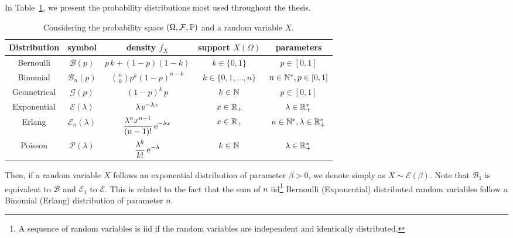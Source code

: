 In Table~\ref{tab:distributions}, we present the probability distributions most used throughout the thesis.
%
\def\arraystretch{1.8}
\begin{table}[H]
    \centering
    \begin{tabular}{c|c|c|c|c}
    \hline
        Distribution  & symbol & density $f_X$ & support $X(\Omega)$ & parameters\\ \hline\hline
        Bernoulli & $\mathscr{B}(p)$ & {\footnotesize$p\,k+(1-p)(1-k)$}  & $k\in\{0,1\}$ & $p\in[0,1]$\\
        Binomial & $\mathscr{B}_n(p)$ & \footnotesize$\displaystyle\binom{n}{k} p^k(1-p)^{n-k}$ & $k\in\{0,1,\dots,n\}$ & $n\in\N^*, p\in[0,1]$\\
        Geometrical & $\mathscr{G}(p)$ & \footnotesize$(1-p)^k\,p$ & $k\in\N$ & $p\in[0,1]$\\
        Exponential & $\mathscr{E}(\lambda)$ & \footnotesize$\lambda \,\euler^{-\lambda x}$ & $x\in\R_+$ & $\lambda\in\R_+^*$\\
        Erlang & $\mathscr{E}_n(\lambda)$ & \footnotesize$\displaystyle\frac{\lambda^n x^{n-1}}{(n-1)!} \,\euler^{-\lambda x}$ & $x\in\R_+$ & $n\in\N^*,\lambda\in\R_+^*$\\
        Poisson & $\mathscr{P}(\lambda)$ & \footnotesize$\displaystyle\frac{\lambda^k}{k!} \,\euler^{-\lambda}$ & $k \in \N$ & $\lambda\in\R_+^*$\\
    \hline
    \end{tabular}
    \caption{Considering the probability space $(\Omega,\cal F, \P)$ and a random variable $X$.}
    \label{tab:distributions}
\end{table} \vspace{-3mm}
\def\arraystretch{1}
%
Then, if a random variable $X$ follows an exponential distribution of parameter $\beta>0$, we denote simply as $X\sim\mathscr{E}(\beta)$.
%
Note that $\mathscr{B}_1$ is equivalent to $\mathscr{B}$ and $\mathscr{E}_1$ to $\mathscr{E}$.
%
This is related to the fact that the sum of $n$ iid\footnote{A sequence of random variables is iid if the random variables are independent and identically distributed.} Bernoulli (Exponential) distributed random variables follow a Binomial (Erlang) distribution of parameter $n$.

